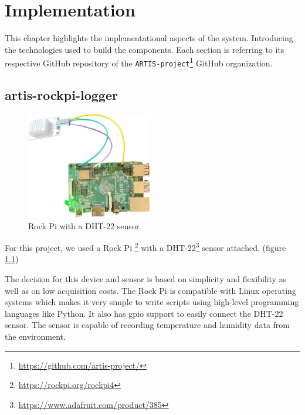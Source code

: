 \chapter{Implementation}
This chapter highlights the implementational aspects of the system. Introducing the technologies used to build the components. Each section is referring to its respective GitHub repository of the \texttt{ARTIS-project}\footnote{\href{https://github.com/artis-project/}{https://github.com/artis-project/}} GitHub organization.

\section{artis-rockpi-logger}

\begin{figure}
    \centering
    \includegraphics[width=0.49\textwidth]{resources/rock-pi.png}
    \caption{Rock Pi with a DHT-22 sensor} 
    \label{fig:rock-pi}
\end{figure}

For this project, we used a Rock Pi \footnote{\href{https://rockpi.org/rockpi4}{https://rockpi.org/rockpi4}} with a DHT-22\footnote{\href{https://www.adafruit.com/product/385}{https://www.adafruit.com/product/385}} sensor attached. (figure \ref{fig:rock-pi})

The decision for this device and sensor is based on simplicity and flexibility as well as on low acquisition costs. The Rock Pi is compatible with Linux operating systems which makes it very simple to write scripts using high-level programming languages like Python. It also has \gls{gpio} support to easily connect the DHT-22 sensor. The sensor is capable of recording temperature and humidity data from the environment.

